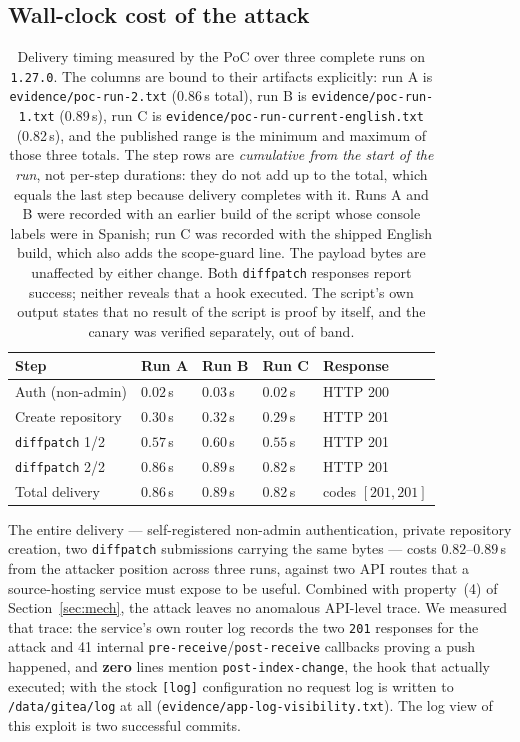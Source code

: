\documentclass[journal]{IEEEtran}
\begin{document}
\subsection{Wall-clock cost of the attack}
\label{sec:timing}

\begin{table}[t]
\centering
\footnotesize
\begin{tabular}{@{}p{2.0cm}p{1.0cm}p{1.0cm}p{1.0cm}p{1.7cm}@{}}
\toprule
Step & Run A & Run B & Run C & Response \\
\midrule
Auth (non-admin) & $0.02$\,s & $0.03$\,s & $0.02$\,s & HTTP 200 \\
Create repository & $0.30$\,s & $0.32$\,s & $0.29$\,s & HTTP 201 \\
\texttt{diffpatch} 1/2 & $0.57$\,s & $0.60$\,s & $0.55$\,s & HTTP 201 \\
\texttt{diffpatch} 2/2 & $0.86$\,s & $0.89$\,s & $0.82$\,s & HTTP 201 \\
\midrule
Total delivery & $\mathbf{0.86}$\,s & $\mathbf{0.89}$\,s & $\mathbf{0.82}$\,s & codes $[201,201]$ \\
\bottomrule
\end{tabular}
\caption{Delivery timing measured by the PoC over three complete runs on
\texttt{1.27.0}. The columns are bound to their artifacts explicitly: run A is
\texttt{evidence/poc-run-2.txt} (0.86\,s total), run B is
\texttt{evidence/poc-run-1.txt} (0.89\,s), run C is
\texttt{evidence/poc-run-current-english.txt} (0.82\,s), and the published range is
the minimum and maximum of those three totals. The step rows are \emph{cumulative from
the start of the run}, not per-step durations: they do not add up to the total, which equals
the last step because delivery completes with it. Runs A and B were recorded with an
earlier build of the script whose console
labels were in Spanish; run C was recorded with the shipped English build, which
also adds the scope-guard line. The payload bytes are unaffected by either
change. Both \texttt{diffpatch} responses report
success; neither reveals that a hook executed. The script's own output states
that no result of the script is proof by itself, and the canary was verified
separately, out of band.}
\label{tab:timing}
\end{table}

The entire delivery --- self-registered non-admin authentication, private
repository creation, two \texttt{diffpatch} submissions carrying the same bytes
--- costs $0.82$--$0.89$\,s from the attacker position across three runs, against
two API routes that a source-hosting service must expose to be useful. Combined
with property~(4) of Section~\ref{sec:mech}, the attack leaves no anomalous
API-level trace. We measured that trace: the service's own router log records
the two \texttt{201} responses for the attack and 41 internal
\texttt{pre-receive}/\texttt{post-receive} callbacks proving a push happened,
and \textbf{zero} lines mention \texttt{post-index-change}, the hook that
actually executed; with the stock \texttt{[log]} configuration no request log is
written to \texttt{/data/gitea/log} at all
(\texttt{evidence/app-log-visibility.txt}). The log view of this exploit is two
successful commits.
\end{document}
